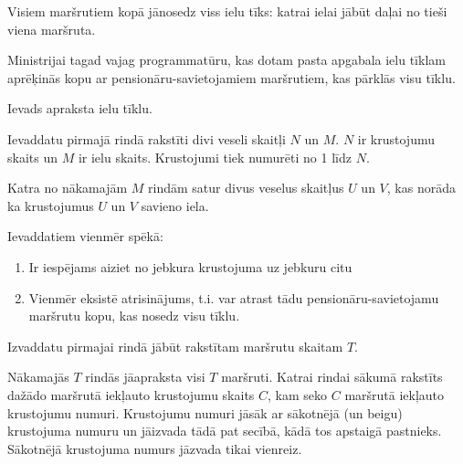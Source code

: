\documentclass{boi2014-lv}
\begin{document}
		Visiem maršrutiem kopā jānosedz viss ielu tīks: katrai ielai jābūt daļai no tieši viena maršruta.

    \Task
		
		Ministrijai tagad vajag programmatūru, kas dotam pasta apgabala ielu tīklam aprēķinās kopu ar pensionāru-savietojamiem maršrutiem, kas pārklās visu tīklu.

    \Input

		Ievads apraksta ielu tīklu.
		
		Ievaddatu pirmajā rindā rakstīti divi veseli skaitļi $N$ un $M$. $N$ ir krustojumu skaits un $M$ ir ielu skaits. Krustojumi tiek numurēti no 1 līdz $N$.

		Katra no nākamajām $M$ rindām satur divus veselus skaitļus $U$ un $V$, kas norāda ka krustojumus $U$ un $V$ savieno iela.

		Ievaddatiem vienmēr spēkā:
    \begin{enumerate}
        \item Ir iespējams aiziet no jebkura krustojuma uz jebkuru citu %
        \item Vienmēr eksistē atrisinājums, t.i. var atrast tādu pensionāru-savietojamu maršrutu kopu, kas nosedz visu tīklu. %
    \end{enumerate}

    \Output
		Izvaddatu pirmajai rindā jābūt rakstītam maršrutu skaitam $T$.
		

		Nākamajās $T$ rindās jāapraksta visi $T$ maršruti. Katrai rindai sākumā rakstīts dažādo maršrutā iekļauto krustojumu skaits $C$, kam seko $C$ maršrutā iekļauto krustojumu numuri. Krustojumu numuri jāsāk ar sākotnējā (un beigu) krustojuma numuru un jāizvada tādā pat secībā, kādā tos apstaigā pastnieks. Sākotnējā krustojuma numurs jāzvada tikai vienreiz.
\end{document}
